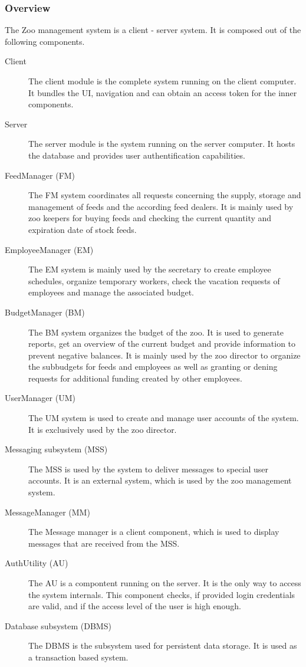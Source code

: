 		\subsubsection{Overview}
		The Zoo management system is a client - server system. It is composed out of the following components.
			\begin{description}
				\item [Client] The client module is the complete system running on the client computer. It bundles the UI, navigation and can obtain an access token for the inner components.
				\item [Server] The server module is the system running on the server computer. It hosts the database and provides user authentification capabilities.
				\item [FeedManager (FM)] The FM system coordinates all requests concerning the supply, storage and management of feeds and the according feed dealers. It is mainly used by zoo keepers for buying feeds and checking the current quantity and expiration date of stock feeds.
				\item [EmployeeManager (EM)] The EM system is mainly used by the secretary to create employee schedules, organize temporary workers, check the vacation requests of employees and manage the associated budget.
				\item [BudgetManager (BM)] The BM system organizes the budget of the zoo. It is used to generate reports, get an overview of the current budget and provide information to prevent negative balances. It is mainly used by the zoo director to organize the subbudgets for feeds and employees as well as granting or dening requests for additional funding created by other employees.
				\item [UserManager (UM)] The UM system is used to create and manage user accounts of the system. It is exclusively used by the zoo director.
				\item [Messaging subsystem (MSS)] The MSS is used by the system to deliver messages to special user accounts. It is an external system, which is used by the zoo management system.
				\item [MessageManager (MM)] The Message manager is a client component, which is used to display messages that are received from the MSS.
				\item [AuthUtility (AU)] The AU is a compontent running on the server. It is the only way to access the system internals. This component checks, if provided login credentials are valid, and if the access level of the user is high enough.
				\item [Database subsystem (DBMS)] The DBMS is the subsystem used for persistent data storage. It is used as a transaction based system.
			\end{description}
			
